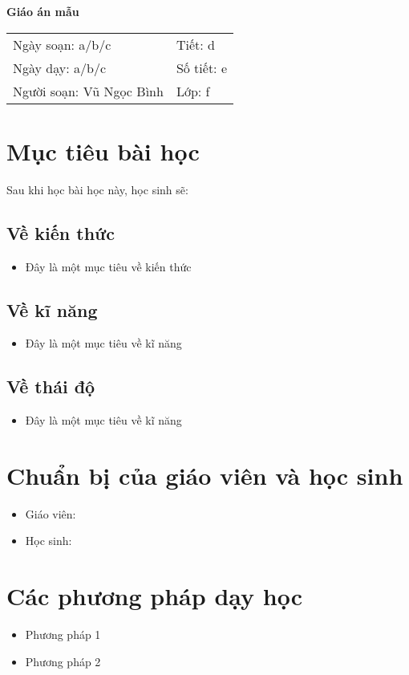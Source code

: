 \documentclass[12pt,a4paper]{article}
\author{Vũ Ngọc Binh}
\begin{document}
	\begin{center}
		\textbf{\LARGE Giáo án mẫu}
	\end{center}
	\begin{tabular} {
		m{}
		m{} 
	}
		Ngày soạn: a/b/c
		& 
		Tiết: d
		\\
		Ngày dạy: a/b/c
		& 
		Số tiết: e
		\\
		Người soạn: Vũ Ngọc Bình
		& 
		Lớp: f
		\\
	\end{tabular}
	\section{Mục tiêu bài học}
	Sau khi học bài học này, học sinh sẽ:
	\subsection{Về kiến thức}
	\begin{itemize}
		\item Đây là một mục tiêu về kiến thức
	\end{itemize}
	\subsection{Về kĩ năng}
	\begin{itemize}
		\item Đây là một mục tiêu về kĩ năng
	\end{itemize}
	\subsection{Về thái độ}
	\begin{itemize}
		\item Đây là một mục tiêu về kĩ năng
	\end{itemize}
	\section{Chuẩn bị của giáo viên và học sinh}
	\begin{itemize}
		\item Giáo viên:
		\item Học sinh:
	\end{itemize}
	\section{Các phương pháp dạy học}
	\begin{itemize}
		\item Phương pháp 1
		\item Phương pháp 2
	\end{itemize}
\end{document}
